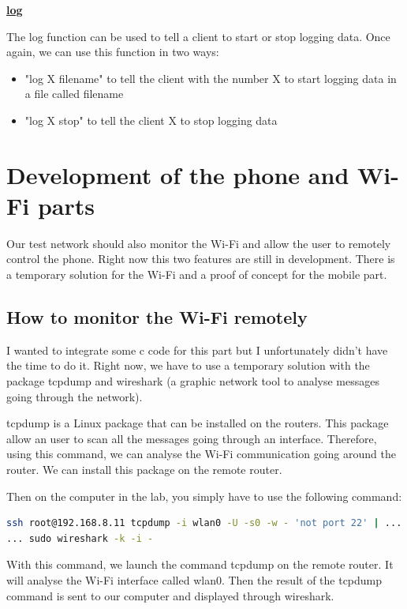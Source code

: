 \hfill \break \underline{\large{\textbf{log}}}

The log function can be used to tell a client to start or stop logging data. Once again, we can use this function in two ways:
\begin{itemize}
	\item "log X filename" to tell the client with the number X to start logging data in a file called filename
	\item "log X stop" to tell the client X to stop logging data
\end{itemize}


\section{Development of the phone and Wi-Fi parts}

Our test network should also monitor the Wi-Fi and allow the user to remotely control the phone.
Right now this two features are still in development. There is a temporary solution for the Wi-Fi and a proof of concept for the mobile part.

\subsection{How to monitor the Wi-Fi remotely}

I wanted to integrate some c code for this part but I unfortunately didn't have the time to do it. Right now, we have to use a temporary solution with the package tcpdump and wireshark (a graphic network tool to analyse messages going through the network).

tcpdump is a Linux package that can be installed on the routers. This package allow an user to scan all the messages going through an interface. Therefore, using this command, we can analyse the Wi-Fi communication going around the router.
We can install this package on the remote router.

Then on the computer in the lab, you simply have to use the following command:

\begin{lstlisting}[language=bash]
ssh root@192.168.8.11 tcpdump -i wlan0 -U -s0 -w - 'not port 22' | ... 
... sudo wireshark -k -i -
\end{lstlisting}

With this command, we launch the command tcpdump on the remote router. It will analyse the Wi-Fi interface called wlan0. Then the result of the tcpdump command is sent to our computer and displayed through wireshark. 


